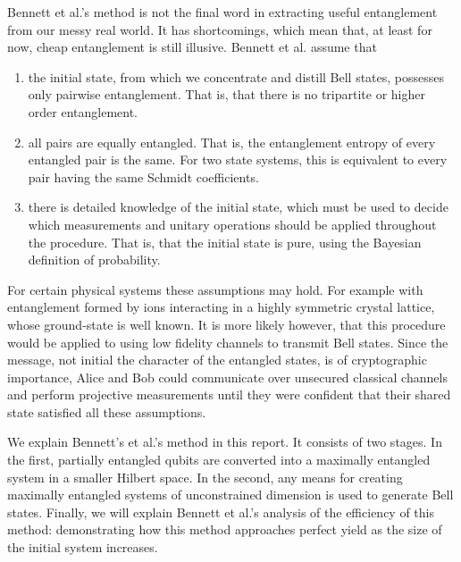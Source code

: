 Bennett et al.'s method is not the final word in extracting useful entanglement from our messy real world.
It has shortcomings, which mean that, at least for now, cheap entanglement is still illusive. 
Bennett et al. assume that
\begin{enumerate}
	\item the initial state, from which we concentrate and distill Bell states, possesses only pairwise entanglement. That is, that there is no tripartite or higher order entanglement.
	\item all pairs are equally entangled. That is, the entanglement entropy of every entangled pair is the same. For two state systems, this is equivalent to every pair having the same Schmidt coefficients.
	\item there is detailed knowledge of the initial state, which must be used to decide which measurements and unitary operations should be applied throughout the procedure. That is, that the initial state is pure, using the Bayesian definition of probability.
\end{enumerate}

For certain physical systems these assumptions may hold. 
For example with entanglement formed by ions interacting in a highly symmetric crystal lattice, whose ground-state is well known.
It is more likely however, that this procedure would be applied to using low fidelity channels to transmit Bell states.
Since the message, not initial the character of the entangled states, is of cryptographic importance, Alice and Bob could communicate over unsecured classical channels and perform projective measurements until they were confident that their shared state satisfied all these assumptions.

We explain Bennett's et al.'s method in this report.
It consists of two stages.
In the first, partially entangled qubits are converted into a maximally entangled system in a smaller Hilbert space.
In the second, any means for creating maximally entangled systems of unconstrained dimension is used to generate Bell states.
Finally, we will explain Bennett et al.'s analysis of the efficiency of this method: demonstrating how this method approaches perfect yield as the size of the initial system increases.
